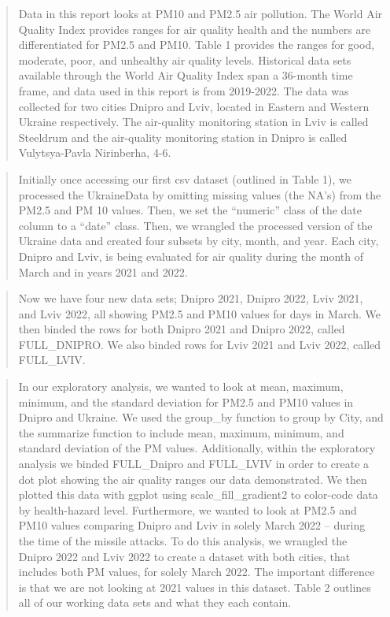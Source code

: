 \documentclass[
  12pt,
]{article}
\begin{document}
\begin{quote}
Data in this report looks at PM10 and PM2.5 air pollution. The World Air
Quality Index provides ranges for air quality health and the numbers are
differentiated for PM2.5 and PM10. Table 1 provides the ranges for good,
moderate, poor, and unhealthy air quality levels. Historical data sets
available through the World Air Quality Index span a 36-month time
frame, and data used in this report is from 2019-2022. The data was
collected for two cities Dnipro and Lviv, located in Eastern and Western
Ukraine respectively. The air-quality monitoring station in Lviv is
called Steeldrum and the air-quality monitoring station in Dnipro is
called Vulytsya-Pavla Nirinberha, 4-6.
\end{quote}

\begin{quote}
Initially once accessing our first csv dataset (outlined in Table 1), we
processed the UkraineData by omitting missing values (the NA's) from the
PM2.5 and PM 10 values. Then, we set the ``numeric'' class of the date
column to a ``date'' class. Then, we wrangled the processed version of
the Ukraine data and created four subsets by city, month, and year. Each
city, Dnipro and Lviv, is being evaluated for air quality during the
month of March and in years 2021 and 2022.
\end{quote}

\begin{quote}
Now we have four new data sets; Dnipro 2021, Dnipro 2022, Lviv 2021, and
Lviv 2022, all showing PM2.5 and PM10 values for days in March. We then
binded the rows for both Dnipro 2021 and Dnipro 2022, called
FULL\_DNIPRO. We also binded rows for Lviv 2021 and Lviv 2022, called
FULL\_LVIV.
\end{quote}

\begin{quote}
In our exploratory analysis, we wanted to look at mean, maximum,
minimum, and the standard deviation for PM2.5 and PM10 values in Dnipro
and Ukraine. We used the group\_by function to group by City, and the
summarize function to include mean, maximum, minimum, and standard
deviation of the PM values. Additionally, within the exploratory
analysis we binded FULL\_Dnipro and FULL\_LVIV in order to create a dot
plot showing the air quality ranges our data demonstrated. We then
plotted this data with ggplot using scale\_fill\_gradient2 to color-code
data by health-hazard level. Furthermore, we wanted to look at PM2.5 and
PM10 values comparing Dnipro and Lviv in solely March 2022 -- during the
time of the missile attacks. To do this analysis, we wrangled the Dnipro
2022 and Lviv 2022 to create a dataset with both cities, that includes
both PM values, for solely March 2022. The important difference is that
we are not looking at 2021 values in this dataset. Table 2 outlines all
of our working data sets and what they each contain.
\end{quote}
\end{document}
